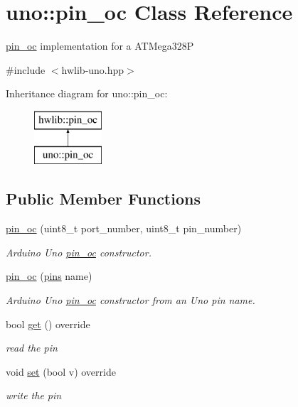 \hypertarget{classuno_1_1pin__oc}{}\section{uno\+:\+:pin\+\_\+oc Class Reference}
\label{classuno_1_1pin__oc}


\hyperlink{classuno_1_1pin__oc}{pin\+\_\+oc} implementation for a A\+T\+Mega328P  




{\ttfamily \#include $<$hwlib-\/uno.\+hpp$>$}

Inheritance diagram for uno\+:\+:pin\+\_\+oc\+:\begin{figure}[H]
\begin{center}
\leavevmode
\includegraphics[height=2.000000cm]{classuno_1_1pin__oc}
\end{center}
\end{figure}
\subsection*{Public Member Functions}
\begin{DoxyCompactItemize}
\item 
\hyperlink{classuno_1_1pin__oc_a54c12b968556a4fbbc6be72d4c3e8150}{pin\+\_\+oc} (uint8\+\_\+t port\+\_\+number, uint8\+\_\+t pin\+\_\+number)
\begin{DoxyCompactList}\small\item\em Arduino Uno \hyperlink{classuno_1_1pin__oc}{pin\+\_\+oc} constructor. \end{DoxyCompactList}\item 
\hyperlink{classuno_1_1pin__oc_a62007c07ad6ee2928d2263cb3efa3813}{pin\+\_\+oc} (\hyperlink{namespaceuno_a0a859f3512bcc3027a090ae07befd5b2}{pins} name)
\begin{DoxyCompactList}\small\item\em Arduino Uno \hyperlink{classuno_1_1pin__oc}{pin\+\_\+oc} constructor from an Uno pin name. \end{DoxyCompactList}\item 
bool \hyperlink{classuno_1_1pin__oc_aed52da1b00bc2cfbb8ef53ce92fdbe79}{get} () override
\begin{DoxyCompactList}\small\item\em read the pin \end{DoxyCompactList}\item 
void \hyperlink{classuno_1_1pin__oc_a4f3191e577d13dab583d5fe86a9d960e}{set} (bool v) override
\begin{DoxyCompactList}\small\item\em write the pin \end{DoxyCompactList}\end{DoxyCompactItemize}


